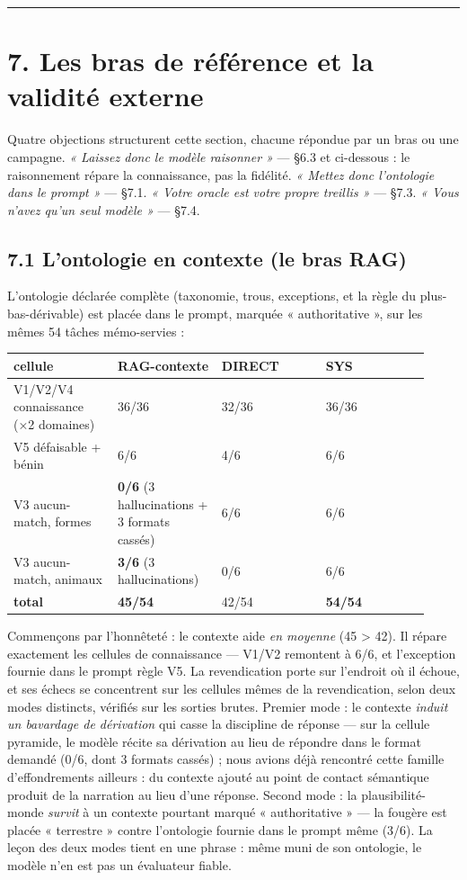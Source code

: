 \documentclass[11pt]{article}
\begin{document}
\medskip\hrule\medskip

\section*{7. Les bras de référence et la validité externe}

Quatre objections structurent cette section, chacune répondue par un bras ou une campagne. \emph{« Laissez donc le modèle raisonner »} — §6.3 et ci-dessous : le raisonnement répare la connaissance, pas la fidélité. \emph{« Mettez donc l'ontologie dans le prompt »} — §7.1. \emph{« Votre oracle est votre propre treillis »} — §7.3. \emph{« Vous n'avez qu'un seul modèle »} — §7.4.

\subsection*{7.1 L'ontologie en contexte (le bras RAG)}

L'ontologie déclarée complète (taxonomie, trous, exceptions, et la règle du plus-bas-dérivable) est placée dans le prompt, marquée « authoritative », sur les mêmes 54 tâches mémo-servies :

\begin{center}\small\begin{tabular}{p{0.23\linewidth}p{0.23\linewidth}p{0.23\linewidth}p{0.23\linewidth}}\toprule
cellule & RAG-contexte & DIRECT & SYS \\ \midrule
V1/V2/V4 connaissance (×2 domaines) & 36/36 & 32/36 & 36/36 \\
V5 défaisable + bénin & 6/6 & 4/6 & 6/6 \\
V3 aucun-match, formes & \textbf{0/6} (3 hallucinations + 3 formats cassés) & 6/6 & 6/6 \\
V3 aucun-match, animaux & \textbf{3/6} (3 hallucinations) & 0/6 & 6/6 \\
\textbf{total} & \textbf{45/54} & 42/54 & \textbf{54/54} \\
\bottomrule\end{tabular}\end{center}

Commençons par l'honnêteté : le contexte aide \emph{en moyenne} (45 > 42). Il répare exactement les cellules de connaissance — V1/V2 remontent à 6/6, et l'exception fournie dans le prompt règle V5. La revendication porte sur l'endroit où il échoue, et ses échecs se concentrent sur les cellules mêmes de la revendication, selon deux modes distincts, vérifiés sur les sorties brutes. Premier mode : le contexte \emph{induit un bavardage de dérivation} qui casse la discipline de réponse — sur la cellule pyramide, le modèle récite sa dérivation au lieu de répondre dans le format demandé (0/6, dont 3 formats cassés) ; nous avions déjà rencontré cette famille d'effondrements ailleurs : du contexte ajouté au point de contact sémantique produit de la narration au lieu d'une réponse. Second mode : la plausibilité-monde \emph{survit} à un contexte pourtant marqué « authoritative » — la fougère est placée « terrestre » contre l'ontologie fournie dans le prompt même (3/6). La leçon des deux modes tient en une phrase : même muni de son ontologie, le modèle n'en est pas un évaluateur fiable.
\end{document}
